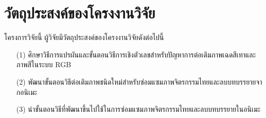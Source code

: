 \clearpage
\section{วัตถุประสงค์ของโครงงานวิจัย}
\hspace{1cm} โครงการวิจัยนี้ ผู้วิจัยมีวัตถุประสงค์ของโครงงานวิจัยดังต่อไปนี้

\begin{itemize}
	\item[(1)] ศึกษาวิธีการแปรผันและขั้นตอนวิธีการเชิงตัวเลขสำหรับปัญหาการต่อเติมภาพเฉดสีเทาและภาพสีในระบบ RGB
	\item[(2)] พัฒนาขั้นตอนวิธีต่อเติมภาพชนิดใหม่สำหรับซ่อมแซมภาพจิตรกรรมไทยและลบบทบรรยายจากอนิเมะ
	\item[(3)] นำขั้นตอนวิธีที่พัฒนาขึ้นไปใช้ในการซ่อมแซมภาพจิตรกรรมไทยและลบบทบรรยายในอนิเมะ
\end{itemize}

